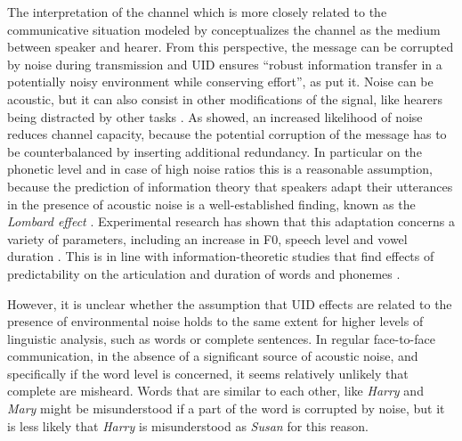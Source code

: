 The interpretation of the channel which is more closely related to the communicative situation modeled by \citet{shannon1948} conceptualizes the channel as the medium between speaker and hearer. From this perspective, the message can be corrupted by noise during transmission and UID ensures ``robust information transfer in a potentially noisy environment while conserving effort'', as \citet[32]{aylett.turk2004} put it. Noise can be acoustic, but it can also consist in other modifications of the signal, like hearers being distracted by other tasks \citep{hauser.etal2019}. As \citet{shannon1948} showed, an increased likelihood of noise reduces channel capacity, because the potential corruption of the message has to be counterbalanced by inserting additional redundancy. In particular on the phonetic level and in case of high noise ratios this is a reasonable assumption, because the prediction of information theory that speakers adapt their utterances in the presence of acoustic noise is a well-established finding, known as the \textit{Lombard effect}  \citep{lombard1911}. Experimental research has shown that this adaptation concerns a variety of parameters, including an increase in F0, speech level and vowel duration \citep{summers.etal1988,junqua1994, junqua1996}. This is in line with information-theoretic studies that find effects of predictability on the articulation and duration of words and phonemes \citep{bell.etal2003, aylett.turk2004, bell.etal2009, brandt.etal2017, brandt.etal2018, malisz.etal2018}.

However, it is unclear whether the assumption that UID effects are related to the presence of environmental noise holds to the same extent for higher levels of linguistic analysis, such as words or complete sentences. In regular face-to-face communication, in the absence of a significant source of acoustic noise, and specifically if the word level is concerned, it seems relatively unlikely that complete are misheard. Words that are similar to each other, like \textit{Harry} and \textit{Mary} might be misunderstood if a part of the word is corrupted by noise, but it is less likely that \textit{Harry} is misunderstood as \textit{Susan} for this reason.

